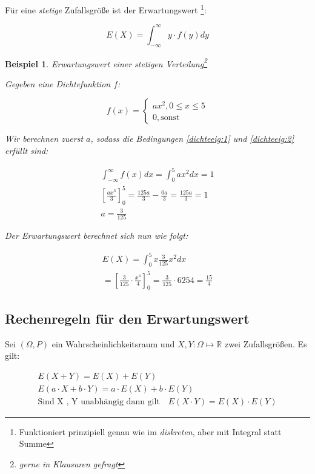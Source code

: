 \documentclass{tufte-handout}
\theoremstyle{own}
\newtheorem{example}{Beispiel}[]
\begin{document}
Für eine \emph{stetige} Zufallsgröße ist der Erwartungswert
\footnote{Funktioniert prinzipiell genau wie im \emph{diskreten}, aber mit Integral statt Summe}:

\begin{equation}
E(X) = \int_{-\infty}^{\infty} y \cdot f(y) dy
\end{equation}

\begin{example}\label{bsp:erwartungswertstetig}
Erwartungswert einer stetigen Verteilung\footnote{gerne in Klausuren gefragt}

Gegeben eine Dichtefunktion $f$:

\begin{equation*}
	f(x) = \begin{cases} 
	ax^2, 0 \leq x \leq 5 \\
	0, \text{sonst}
	\end{cases}
\end{equation*}

Wir berechnen zuerst $a$, sodass die Bedingungen \eqref{dichteeig:1} und
\eqref{dichteeig:2} erfüllt sind:

\begin{gather*}
\int_{-\infty}^{\infty} f(x)dx = \int_0^5 ax^2 dx = 1 \\
[\frac{a x^3}{3}]_0^5 = \frac{125a}{3} - \frac{0a}{3} =  \frac{125a}{3} = 1 \\
a = \frac{3}{125}
\end{gather*}

Der Erwartungswert berechnet sich nun wie folgt:

\begin{gather*}
E(X) = \int_0^5 x \frac{3}{125} x^2 dx \\
= [\frac{3}{125} \cdot \frac{x^4}{4}]_0^5 = \frac{3}{125} \cdot {625}{4} = \frac{15}{4}
\end{gather*}

\end{example}

\subsection{Rechenregeln für den Erwartungswert}

Sei $(\Omega, P)$ ein Wahrscheinlichkeitsraum und $X,Y : \Omega \mapsto \mathbb{R}$ zwei Zufallsgrößen. Es gilt:

\begin{gather}
E(X + Y) = E(X) + E(Y) \\
E( a \cdot X + b \cdot Y) = a \cdot E(X) + b \cdot E(Y)  \\
\text{Sind X , Y unabhängig dann gilt} \hspace{1em} E (X \cdot Y ) = E ( X )\cdot E ( Y )
\end{gather}
\end{document}
